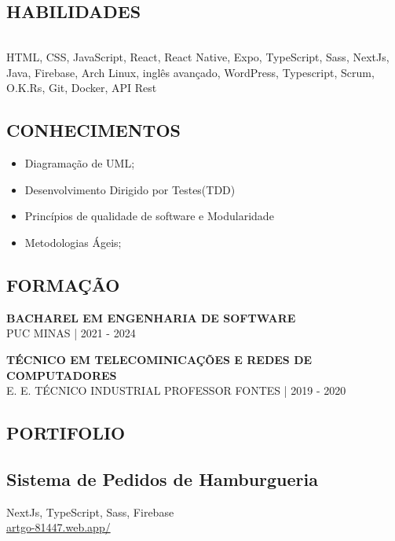 \documentclass[a4paper]{article}
\begin{document}
\begin{multicols}{2}
  \begin{framed}
    \section{HABILIDADES}
    \begin{tabular}{r|p{5cm}}
    \end{tabular}
    HTML, CSS, JavaScript, React, React Native, Expo, TypeScript, Sass,  NextJs, Java, Firebase, Arch Linux, inglês avançado, WordPress, Typescript, Scrum, O.K.Rs, Git, Docker, API Rest
  \end{framed}

  \begin{framed}
    \section{CONHECIMENTOS}
    \begin{itemize}
      \item Diagramação de UML;
      \item Desenvolvimento Dirigido por Testes(TDD)
      \item Princípios de qualidade de software e Modularidade
      \item Metodologias Ágeis;
    \end{itemize}
  \end{framed}

  \begin{framed}
    \section{FORMAÇÃO}

    \normalsize\textbf{BACHAREL EM ENGENHARIA DE SOFTWARE}\\
    \footnotesize{PUC MINAS | 2021 - 2024}

    \normalsize\textbf{TÉCNICO EM TELECOMINICAÇÕES E REDES DE COMPUTADORES}\\
    \footnotesize{E. E. TÉCNICO INDUSTRIAL PROFESSOR FONTES | 2019 - 2020}
  \end{framed}

  \begin{framed}
    \section{PORTIFOLIO}
      \small\subsection{Sistema de Pedidos de Hamburgueria}
      \footnotesize{NextJs, TypeScript, Sass, Firebase}\\
      \href{https://artgo-81447.web.app/}{artgo-81447.web.app/}


\end{framed}
\end{multicols}
\end{document}
